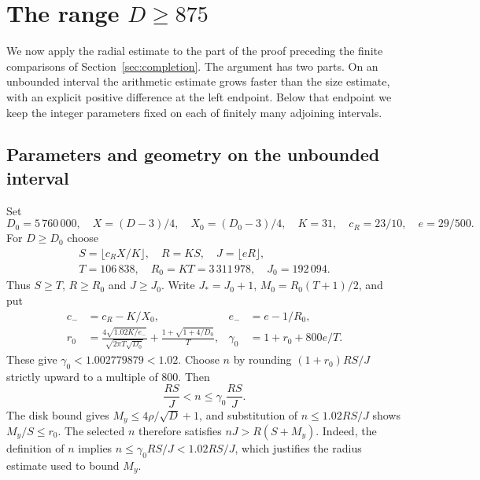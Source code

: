 \section{The range \texorpdfstring{$D\geq875$}{D >= 875}}\label{app:global}
We now apply the radial estimate to the part of the proof preceding the
finite comparisons of Section~\ref{sec:completion}. The argument has two
parts. On an unbounded interval the arithmetic estimate grows faster
than the size estimate, with an explicit positive difference at the left
endpoint. Below that endpoint we keep the integer parameters fixed on
each of finitely many adjoining intervals.

\subsection{Parameters and geometry on the unbounded interval}
Set
\[
 D_0=5\,760\,000,\quad X=(D-3)/4,\quad X_0=(D_0-3)/4,
 \quad K=31,\quad c_R=23/10,\quad e=29/500.
\]
For $D\geq D_0$ choose
\begin{gather*}
 S=\lfloor c_RX/K\rfloor,\quad R=KS,\quad J=\lfloor eR\rfloor,\\
 T=106\,838,\quad R_0=KT=3\,311\,978,\quad J_0=192\,094.
\end{gather*}
Thus $S\geq T$, $R\geq R_0$ and $J\geq J_0$.
Write $J_*=J_0+1$, $M_0=R_0(T+1)/2$, and put
\begin{align*}
 c_-&=c_R-K/X_0,& e_-&=e-1/R_0,\\
 r_0&=\frac{4\sqrt{1.02K/e_-}}{\sqrt{2\pi T\sqrt{D_0}}}
            +\frac{1+\sqrt{1+4/D_0}}T,&
 \gamma_0&=1+r_0+800e/T.
\end{align*}
These give $\gamma_0<1.002779879<1.02$.
Choose $n$ by rounding $(1+r_0)RS/J$ strictly upward to a multiple of
$800$. Then
\begin{equation}\label{eq:global-node-bounds}
 \frac{RS}{J}<n\leq\gamma_0\frac{RS}{J}.
\end{equation}
The disk bound gives $M_y\leq4\rho/\sqrt D+1$, and substitution of
$n\leq1.02RS/J$ shows $M_y/S\leq r_0$. The selected $n$ therefore
satisfies $nJ>R(S+M_y)$. Indeed, the definition of $n$ implies $n\leq\gamma_0RS/J<1.02RS/J$, which
justifies the radius estimate used to bound $M_y$.

